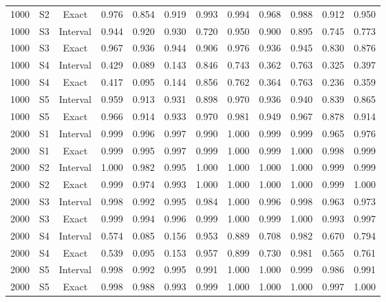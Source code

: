 \documentclass[12pt]{article}
\theoremstyle{definition}
\theoremstyle{remark}
\begin{document}
\begin{longtable}{rccrrrrrrrrr}
1000 & S2 & Exact & 0.976 & 0.854 & 0.919 & 0.993 & 0.994 & 0.968 & 0.988 & 0.912 & 0.950 \\
1000 & S3 & Interval & 0.944 & 0.920 & 0.930 & 0.720 & 0.950 & 0.900 & 0.895 & 0.745 & 0.773 \\
1000 & S3 & Exact & 0.967 & 0.936 & 0.944 & 0.906 & 0.976 & 0.936 & 0.945 & 0.830 & 0.876 \\
1000 & S4 & Interval & 0.429 & 0.089 & 0.143 & 0.846 & 0.743 & 0.362 & 0.763 & 0.325 & 0.397 \\
1000 & S4 & Exact & 0.417 & 0.095 & 0.144 & 0.856 & 0.762 & 0.364 & 0.763 & 0.236 & 0.359 \\
1000 & S5 & Interval & 0.959 & 0.913 & 0.931 & 0.898 & 0.970 & 0.936 & 0.940 & 0.839 & 0.865 \\
1000 & S5 & Exact & 0.966 & 0.914 & 0.933 & 0.970 & 0.981 & 0.949 & 0.967 & 0.878 & 0.914 \\
2000 & S1 & Interval & 0.999 & 0.996 & 0.997 & 0.990 & 1.000 & 0.999 & 0.999 & 0.965 & 0.976 \\
2000 & S1 & Exact & 0.999 & 0.995 & 0.997 & 0.999 & 1.000 & 0.999 & 1.000 & 0.998 & 0.999 \\
2000 & S2 & Interval & 1.000 & 0.982 & 0.995 & 1.000 & 1.000 & 1.000 & 1.000 & 0.999 & 0.999 \\
2000 & S2 & Exact & 0.999 & 0.974 & 0.993 & 1.000 & 1.000 & 1.000 & 1.000 & 0.999 & 1.000 \\
2000 & S3 & Interval & 0.998 & 0.992 & 0.995 & 0.984 & 1.000 & 0.996 & 0.998 & 0.963 & 0.973 \\
2000 & S3 & Exact & 0.999 & 0.994 & 0.996 & 0.999 & 1.000 & 0.999 & 1.000 & 0.993 & 0.997 \\
2000 & S4 & Interval & 0.574 & 0.085 & 0.156 & 0.953 & 0.889 & 0.708 & 0.982 & 0.670 & 0.794 \\
2000 & S4 & Exact & 0.539 & 0.095 & 0.153 & 0.957 & 0.899 & 0.730 & 0.981 & 0.565 & 0.761 \\
2000 & S5 & Interval & 0.998 & 0.992 & 0.995 & 0.991 & 1.000 & 1.000 & 0.999 & 0.986 & 0.991 \\
2000 & S5 & Exact & 0.998 & 0.988 & 0.993 & 0.999 & 1.000 & 1.000 & 1.000 & 0.997 & 1.000 \\
\end{longtable}
\endgroup
\end{document}
